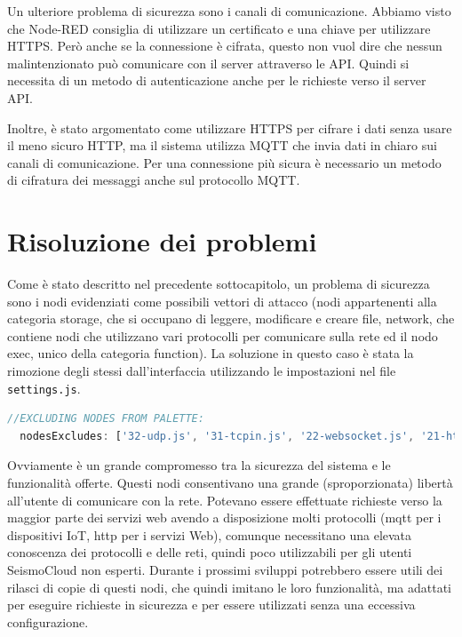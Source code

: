 \documentclass[a4paper,10pt]{memoir}
\begin{document}
Un ulteriore problema di sicurezza sono i canali di comunicazione. Abbiamo visto che Node-RED consiglia di utilizzare un certificato e una chiave per utilizzare HTTPS.
Però anche se la connessione è cifrata, questo non vuol dire che nessun malintenzionato può comunicare con il server attraverso le API.
Quindi si necessita di un metodo di autenticazione anche per le richieste verso il server API.

Inoltre, è stato argomentato come utilizzare HTTPS per cifrare i dati senza usare il meno sicuro HTTP, ma il sistema utilizza MQTT che invia dati in chiaro sui canali di comunicazione.
Per una connessione più sicura è necessario un metodo di cifratura dei messaggi anche sul protocollo MQTT.


\section{Risoluzione dei problemi}

Come è stato descritto nel precedente sottocapitolo, un problema di sicurezza sono i nodi evidenziati come possibili vettori di attacco (nodi appartenenti alla categoria storage, che si occupano di leggere, modificare e creare file, network, che contiene nodi che utilizzano vari protocolli per comunicare sulla rete ed il nodo exec, unico della categoria function). La soluzione in questo caso è stata la rimozione degli stessi dall'interfaccia utilizzando le impostazioni nel file \texttt{settings.js}.
\begin{lstlisting}[language=Javascript, firstnumber=75]
//EXCLUDING NODES FROM PALETTE:
  nodesExcludes: ['32-udp.js', '31-tcpin.js', '22-websocket.js', '21-httprequest.js', '21-httpin.js', '10-mqtt.js', '06-httpproxy.js', '05-tls.js', '90-exec.js', 'node-red-node-tail', '10-file.js', '23-watch.js'],
\end{lstlisting}
Ovviamente è un grande compromesso tra la sicurezza del sistema e le funzionalità offerte. Questi nodi consentivano una grande (sproporzionata) libertà all'utente di comunicare con la rete. Potevano essere effettuate richieste verso la maggior parte dei servizi web avendo a disposizione molti protocolli (mqtt per i dispositivi IoT, http per i servizi Web), comunque necessitano una elevata conoscenza dei protocolli e delle reti, quindi poco utilizzabili per gli utenti SeismoCloud non esperti. Durante i prossimi sviluppi potrebbero essere utili dei rilasci di copie di questi nodi, che quindi imitano le loro funzionalità, ma adattati per eseguire richieste in sicurezza e per essere utilizzati senza una eccessiva configurazione.
\end{document}
